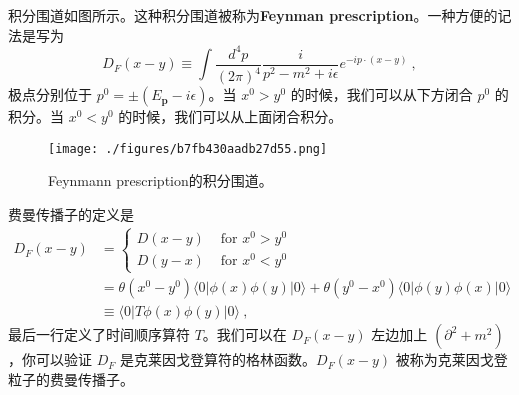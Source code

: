 积分围道如图所示。这种积分围道被称为\textbf{Feynman prescription}。一种方便的记法是写为
\begin{equation}
D_F(x-y) \equiv \int \frac{d^4p}{(2\pi)^4} \frac{i}{p^2-m^2+i\epsilon} e^{-ip\cdot(x-y)}~,
\end{equation}
极点分别位于 $p^0 = \pm(E_{\mathbf p}-i\epsilon)$。当 $x^0>y^0$ 的时候，我们可以从下方闭合 $p^0$ 的积分。当 $x^0<y^0$ 的时候，我们可以从上面闭合积分。
\begin{figure}[ht]
\centering
\texttt{[image: ./figures/b7fb430aadb27d55.png]}
\caption{Feynmann prescription的积分围道。} \label{fig_Klein_2}
\end{figure}
费曼传播子的定义是
\begin{equation}\label{eq_Klein_3}
\begin{aligned}
D_{F}(x-y) &= \begin{cases}D(x-y) & \text { for } x^{0}>y^{0} \\
D(y-x) & \text { for } x^{0}<y^{0}\end{cases} \\
&=\theta\left(x^{0}-y^{0}\right)\langle 0|\phi(x) \phi(y)| 0\rangle+\theta\left(y^{0}-x^{0}\right)\langle 0|\phi(y) \phi(x)| 0\rangle \\
& \equiv\langle 0|T \phi(x) \phi(y)| 0\rangle~,
\end{aligned}
\end{equation}
最后一行定义了时间顺序算符 $T$。我们可以在 $D_F(x-y)$ 左边加上 $(\partial^2+m^2)$，你可以验证 $D_F$ 是克莱因戈登算符的格林函数。$D_F(x-y)$ 被称为克莱因戈登粒子的费曼传播子。

